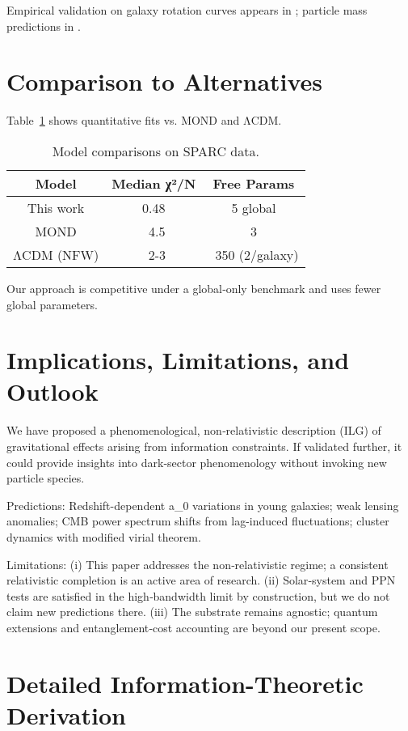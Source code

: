 \documentclass[twocolumn,prd,amsmath,amssymb,aps,superscriptaddress,nofootinbib]{revtex4-2}
\begin{document}
Empirical validation on galaxy rotation curves appears in \cite{Washburn2025a}; particle mass predictions in \cite{Washburn2025b}.

\section{Comparison to Alternatives}

Table~\ref{tab:comparison} shows quantitative fits vs. MOND and ΛCDM.

\begin{table}
\caption{Model comparisons on SPARC data.}
\label{tab:comparison}
\begin{tabular}{ccc}
\hline
Model & Median χ²/N & Free Params \\
\hline
This work & 0.48 & 5 global \\
MOND & ~4.5 & 3 \\
ΛCDM (NFW) & ~2-3 & ~350 (2/galaxy) \\
\hline
\end{tabular}
\end{table}

Our approach is competitive under a global‑only benchmark and uses fewer global parameters.

\section{Implications, Limitations, and Outlook}
\label{sec:conclusion}

We have proposed a phenomenological, non‑relativistic description (ILG) of gravitational effects arising from information constraints. If validated further, it could provide insights into dark‑sector phenomenology without invoking new particle species.

Predictions: Redshift-dependent a_0 variations in young galaxies; weak lensing anomalies; CMB power spectrum shifts from lag-induced fluctuations; cluster dynamics with modified virial theorem.

Limitations: (i) This paper addresses the non‑relativistic regime; a consistent relativistic completion is an active area of research. (ii) Solar‑system and PPN tests are satisfied in the high‑bandwidth limit by construction, but we do not claim new predictions there. (iii) The substrate remains agnostic; quantum extensions and entanglement‑cost accounting are beyond our present scope.

\appendix

\section{Detailed Information-Theoretic Derivation}
\end{document}
